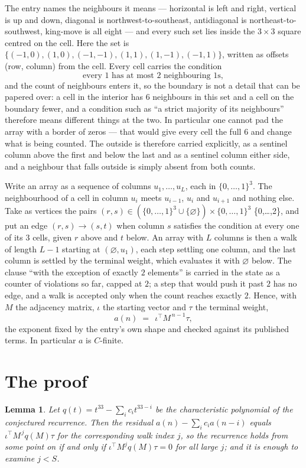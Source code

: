 \documentclass[11pt,a4paper]{article}
\theoremstyle{plain}
\newtheorem{lemma}[theorem]{Lemma}
\theoremstyle{definition}
\begin{document}
The entry names the neighbours it means --- horizontal is left and right, vertical is up and
down, diagonal is northwest-to-southeast, antidiagonal is northeast-to-southwest, king-move is
all eight --- and every such set lies inside the $3\times3$ square centred on the cell. Here
the set is $\{(-1,0), (1,0), (-1,-1), (1,1), (1,-1), (-1,1)\}$, written as offsets (row, column) from the cell. Every cell carries
the condition
\[
\text{every 1 has at most 2 neighbouring 1s},
\]
and the count of neighbours enters it, so the boundary is not a detail that can be papered
over: a cell in the interior has $6$ neighbours in this set and a cell on the boundary
fewer, and a condition such as ``a strict majority of its neighbours'' therefore means
different things at the two. In particular one cannot pad the array with a border of zeros ---
that would give every cell the full $6$ and change what is being counted. The outside is
therefore carried
explicitly, as a sentinel column above the first and below the last and as a sentinel column
either side, and a neighbour that falls outside is simply absent from both counts.

Write an array as a sequence of columns $u_1,\dots,u_L$, each in
$\{0,\dots,1\}^{3}$. The neighbourhood of a cell in column $u_i$ meets $u_{i-1}$,
$u_i$ and $u_{i+1}$ and nothing else. Take as vertices the pairs
$(r,s)\in(\{0,\dots,1\}^{3}\cup\{\varnothing\})\times\{0,\dots,1\}^{3}$ \times \{0,\dots,2\},
and put an edge $(r,s)\to(s,t)$ when column $s$ satisfies the condition at every one of its
$3$ cells, given $r$ above and $t$ below. An array with $L$ columns is then a walk of length
$L-1$ starting at $(\varnothing,u_1)$, each step settling one column, and the last column is
settled by the terminal weight, which evaluates it with $\varnothing$ below. The clause ``with the exception of exactly $2$ elements'' is carried in
the state as a counter of violations so far, capped at $2$; a step that would push it past
$2$ has no edge, and a walk is accepted only when the count reaches exactly $2$. Hence,
with $M$ the adjacency matrix, $\iota$ the starting vector and $\tau$ the terminal weight,
\[
a(n)\;=\;\,\iota^{\!\top}M^{\,n-1}\tau ,
\]
the exponent fixed by the entry's own shape and checked against its published terms. In
particular $a$ is $C$-finite.

\section{The proof}

\begin{lemma}\label{lem:crit}
Let $q(t)=t^{33}-\sum_i c_it^{33-i}$ be the characteristic polynomial of the
conjectured recurrence. Then the residual $a(n)-\sum_ic_ia(n-i)$ equals
$\iota^{\!\top}M^{\,j}q(M)\tau$ for the corresponding walk index $j$, so the
recurrence holds from some point on if and only if $\iota^{\!\top}M^{j}q(M)\tau=0$ for all
large $j$; and it is enough to examine $j<S$.
\end{lemma}
\end{document}
